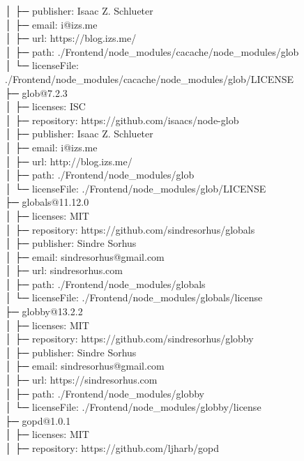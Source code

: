\documentclass[
    paper=a4,
    twoside=false,
    parskip=half,
    listof=entryprefix,
    listof=totoc,
    index=totoc,
    bibliography=totoc,
    headsepline,
]{scrbook}
\begin{document}
    │  ├─ publisher: Isaac Z. Schlueter\\
    │  ├─ email: i@izs.me\\
    │  ├─ url: https://blog.izs.me/\\
    │  ├─ path: ./Frontend/node\_modules/cacache/node\_modules/glob\\
    │  └─ licenseFile: ./Frontend/node\_modules/cacache/node\_modules/glob/LICENSE\\
    ├─ glob@7.2.3\\
    │  ├─ licenses: ISC\\
    │  ├─ repository: https://github.com/isaacs/node-glob\\
    │  ├─ publisher: Isaac Z. Schlueter\\
    │  ├─ email: i@izs.me\\
    │  ├─ url: http://blog.izs.me/\\
    │  ├─ path: ./Frontend/node\_modules/glob\\
    │  └─ licenseFile: ./Frontend/node\_modules/glob/LICENSE\\
    ├─ globals@11.12.0\\
    │  ├─ licenses: MIT\\
    │  ├─ repository: https://github.com/sindresorhus/globals\\
    │  ├─ publisher: Sindre Sorhus\\
    │  ├─ email: sindresorhus@gmail.com\\
    │  ├─ url: sindresorhus.com\\
    │  ├─ path: ./Frontend/node\_modules/globals\\
    │  └─ licenseFile: ./Frontend/node\_modules/globals/license\\
    ├─ globby@13.2.2\\
    │  ├─ licenses: MIT\\
    │  ├─ repository: https://github.com/sindresorhus/globby\\
    │  ├─ publisher: Sindre Sorhus\\
    │  ├─ email: sindresorhus@gmail.com\\
    │  ├─ url: https://sindresorhus.com\\
    │  ├─ path: ./Frontend/node\_modules/globby\\
    │  └─ licenseFile: ./Frontend/node\_modules/globby/license\\
    ├─ gopd@1.0.1\\
    │  ├─ licenses: MIT\\
    │  ├─ repository: https://github.com/ljharb/gopd\\
\end{document}
